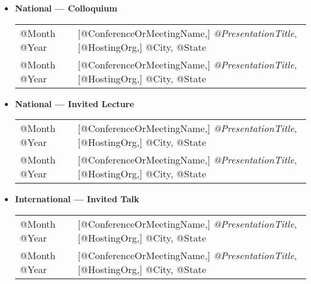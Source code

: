 \documentclass[10pt]{article}
\begin{document}
\begin{itemize}
\item[] \textbf{National --- Colloquium}

\begin{tabular}{l@{\quad\ }p{34em}} 
 @Month @Year 
 & [@ConferenceOrMeetingName,] \emph{@PresentationTitle},
   [@HostingOrg,]
   @City, @State
   \smallskip \\
 @Month @Year 
 & [@ConferenceOrMeetingName,] \emph{@PresentationTitle},
   [@HostingOrg,]
   @City, @State
\end{tabular}

\item[] \textbf{National --- Invited Lecture}

\begin{tabular}{l@{\quad\ }p{34em}} 
 @Month @Year 
 & [@ConferenceOrMeetingName,] \emph{@PresentationTitle},
   [@HostingOrg,]
   @City, @State
   \smallskip \\
 @Month @Year 
 & [@ConferenceOrMeetingName,] \emph{@PresentationTitle},
   [@HostingOrg,]
   @City, @State
\end{tabular}



\item[] \textbf{International --- Invited Talk}
\\[1.3ex]
\begin{tabular}{l@{\quad\ }p{34em}} 
 @Month @Year 
 & [@ConferenceOrMeetingName,] \emph{@PresentationTitle},
   [@HostingOrg,]
   @City, @State
   \smallskip \\
 @Month @Year 
 & [@ConferenceOrMeetingName,] \emph{@PresentationTitle},
   [@HostingOrg,]
   @City, @State
\end{tabular}


\end{itemize}
\end{document}
